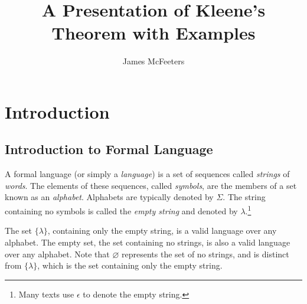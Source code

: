 \documentclass{bcthesis}
\title{A Presentation of Kleene's Theorem with Examples}
\author{James McFeeters}
\newif\ifbuildfrontmatter
\renewcommand{\emptyset}{\ensuremath{\varnothing}\xspace}
\begin{document}
\ifbuildfrontmatter
\frontmatter

	\maketitle

	\begin{abstract}
		Your abstract goes here.
	\end{abstract}


	\begin{acknowledgments}
		Here you should acknowledge any special help on your project, or particular influences on your life or mathematical development.
	\end{acknowledgments}

	\tableofcontents
\fi

\mainmatter

\chapter{Introduction}%
\label{ch:introduction}

	\section{Introduction to Formal Language} %
	\label{sec:introduction_to_formal_language}

		A formal language (or simply a \textit{language}) is a set of sequences called \textit{strings} of \textit{words}.
		The elements of these sequences, called \textit{symbols}, are the members of a set known as an \textit{alphabet}.
		Alphabets are typically denoted by $\Sigma$.
		The string containing no symbols is called the \textit{empty string} and denoted by $\lambda$.\footnote{
			Many texts use $\epsilon$ to denote the empty string.
		}

		The set $\{ \lambda \}$, containing only the empty string, is a valid language over any alphabet.
		The empty set, the set containing no strings, is also a valid language over any alphabet.
		Note that $\emptyset$ represents the set of no strings, and is distinct from $\{ \lambda \}$, which is the set containing only the empty string.
\end{document}
